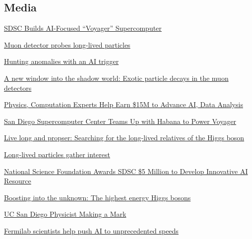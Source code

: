 \documentclass[11pt]{res}
\newcommand{\MarginText}[1]{\section{#1}\vspace{10pt}}
\begin{document}
\begin{resume}
  \MarginText{Media}

  \href{https://www.intel.com/content/www/us/en/customer-spotlight/stories/san-diego-supercomputer-customer-story.html}{SDSC Builds AI-Focused ``Voyager'' Supercomputer}

  \href{https://cerncourier.com/a/muon-detector-probes-long-lived-particles/}{Muon detector probes long-lived particles}

  \href{https://cerncourier.com/a/hunting-anomalies-with-an-ai-trigger/}{Hunting anomalies with an AI trigger}

  \href{https://cms.cern/news/new-window-shadow-world-exotic-particle-decays-muon-detectors}{A new window into the shadow world: Exotic particle decays in the muon detectors}

  \href{https://ucsdnews.ucsd.edu/pressrelease/physics-computation-experts-help-earn-15m-to-advance-ai-data-analysis}{Physics, Computation Experts Help Earn \$15M to Advance AI, Data Analysis}

  \href{https://ucsdnews.ucsd.edu/pressrelease/san-diego-supercomputer-center-teams-up-with-habana-to-power-voyager}{San Diego Supercomputer Center Teams Up with Habana to Power Voyager}

  \href{https://cms.cern/news/live-long-and-prosper-searching-long-lived-relatives-higgs-boson}{Live long and propser: Searching for the long-lived relatives of the Higgs boson}

  \href{https://cerncourier.com/a/long-lived-particles-gather-interest/}{Long-lived particles gather interest}

  \href{https://ucsdnews.ucsd.edu/pressrelease/national-science-foundation-awards-sdsc-5-million-to-develop-innovative-ai-resource}{National Science Foundation Awards SDSC \$5 Million to Develop Innovative AI Resource}

  \href{https://cms.cern/news/boosting-unknown-highest-energy-higgs-bosons}{Boosting into the unknown: The highest energy Higgs bosons}

  \href{https://physicalsciences.ucsd.edu/media-events/articles/2020/uc-san-diego-physicist-making-a-mark.html}{UC San Diego Physicist Making a Mark}

  \href{https://news.fnal.gov/2019/01/fermilab-scientists-help-push-ai-to-unprecedented-speeds/}{Fermilab scientists help push AI to unprecedented speeds}



\end{resume}
\end{document}
